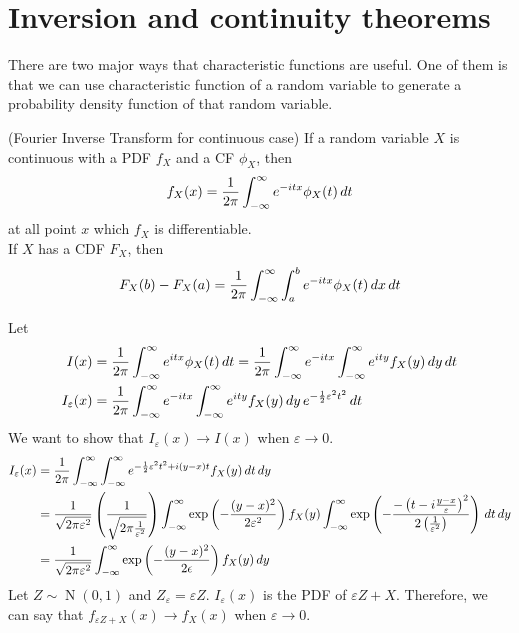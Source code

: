 \documentclass{huhtakm-template-book}
\DeclareMathOperator{\N}{N}
\begin{document}
\section{Inversion and continuity theorems}
There are two major ways that characteristic functions are useful. One of them is that we can use characteristic function of a random variable to generate a probability density function of that random variable.
\begin{thm}(Fourier Inverse Transform for continuous case)
	If a random variable $X$ is continuous with a PDF $f_{X}$ and a CF $\phi_{X}$, then
	\begin{equation*}
		f_{X}(x)=\frac{1}{2\pi}\int_{-\infty}^{\infty} e^{-itx}\phi_{X}(t)\,dt
	\end{equation*}
	at all point $x$ which $f_{X}$ is differentiable.\\
	If $X$ has a CDF $F_{X}$, then
	\begin{equation*}
		F_{X}(b)-F_{X}(a)=\frac{1}{2\pi}\int_{-\infty}^{\infty}\int_{a}^{b}e^{-itx}\phi_{X}(t)\,dx\,dt
	\end{equation*}
\end{thm}
\begin{proofing}
	Let
	\begin{align*}
		I(x)&=\frac{1}{2\pi}\int_{-\infty}^{\infty} e^{itx}\phi_{X}(t)\,dt=\frac{1}{2\pi}\int_{-\infty}^{\infty} e^{-itx}\int_{-\infty}^{\infty} e^{ity}f_{X}(y)\,dy\,dt\\
		I_{\varepsilon}(x)&=\frac{1}{2\pi}\int_{-\infty}^{\infty} e^{-itx}\int_{-\infty}^{\infty} e^{ity}f_{X}(y)\,dy\,e^{-\frac{1}{2}\varepsilon^{2}t^{2}}\,dt
	\end{align*}
	We want to show that $I_{\varepsilon}(x)\to I(x)$ when $\varepsilon\to 0$.
	\begin{align*}
		I_{\varepsilon}(x)&=\frac{1}{2\pi}\int_{-\infty}^{\infty}\int_{-\infty}^{\infty} e^{-\frac{1}{2}\varepsilon^{2}t^{2}+i(y-x)t}f_{X}(y)\,dt\,dy\\
		&=\frac{1}{\sqrt{2\pi\varepsilon^{2}}}\left(\frac{1}{\sqrt{2\pi\frac{1}{\varepsilon^{2}}}}\right)\int_{-\infty}^{\infty}\exp\left(-\frac{(y-x)^{2}}{2\varepsilon^{2}}\right)f_{X}(y)\int_{-\infty}^{\infty}\exp\left(-\frac{-\left(t-i\frac{y-x}{\varepsilon}\right)^{2}}{2\left(\frac{1}{\varepsilon^{2}}\right)}\right)\,dt\,dy\\
		&=\frac{1}{\sqrt{2\pi\varepsilon^{2}}}\int_{-\infty}^{\infty}\exp\left(-\frac{(y-x)^{2}}{2\epsilon}\right)f_{X}(y)\,dy
	\end{align*}
	Let $Z\sim\N(0,1)$ and $Z_{\varepsilon}=\varepsilon Z$. $I_{\varepsilon}(x)$ is the PDF of $\varepsilon Z+X$. Therefore, we can say that $f_{\varepsilon Z+X}(x)\to f_{X}(x)$ when $\varepsilon\to 0$.
\end{proofing}
\end{document}
